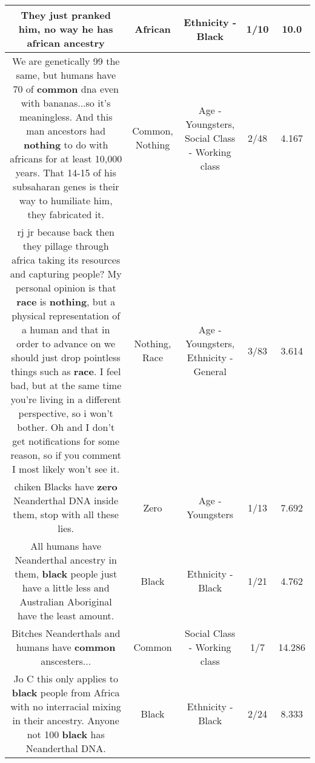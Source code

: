 \documentclass[11pt]{article}
\newlength\mylength
\begin{document}
\begin{center}
\begin{longtable}{|C{.65\mylength}|C{.30\mylength}|C{.12\mylength}|C{.12\mylength}|C{.12\mylength}|}
  \small They just pranked him, no way he has \textbf{african} ancestry\normalsize   & African & Ethnicity - Black & 1/10 & 10.0 \\  \hline
  \small We are genetically 99 the same, but humans have 70 of \textbf{common} dna even with bananas...so it's meaningless. And this man ancestors had \textbf{nothing} to do with africans for at least 10,000 years. That 14-15 of his subsaharan genes is their way to humiliate him, they fabricated it.\normalsize   & Common, Nothing & Age - Youngsters, Social Class - Working class & 2/48 & 4.167 \\  \hline
  \small rj jr because back then they pillage through africa taking its resources and capturing people? My personal opinion is that \textbf{race} is \textbf{nothing}, but a physical representation of a human and that in order to advance on we should just drop pointless things such as \textbf{race}. I feel bad, but at the same time you're living in a different perspective, so i won't bother. Oh and I don't get notifications for some reason, so if you comment I most likely won't see it.\normalsize   & Nothing, Race & Age - Youngsters, Ethnicity - General & 3/83 & 3.614 \\  \hline
  \small chiken Blacks have \textbf{zero} Neanderthal DNA inside them, stop with all these lies.\normalsize   & Zero & Age - Youngsters & 1/13 & 7.692 \\  \hline
  \small All humans have Neanderthal ancestry in them, \textbf{black} people just have a little less and Australian Aboriginal have the least amount.\normalsize   & Black & Ethnicity - Black & 1/21 & 4.762 \\  \hline
  \small Bitches Neanderthals and humans have \textbf{common} anscesters...\normalsize   & Common & Social Class - Working class & 1/7 & 14.286 \\  \hline
  \small Jo C this only applies to \textbf{black} people from Africa with no interracial mixing in their ancestry. Anyone not 100 \textbf{black} has Neanderthal DNA.\normalsize   & Black & Ethnicity - Black & 2/24 & 8.333 \\  \hline

\end{longtable}
\end{center}
\end{document}
